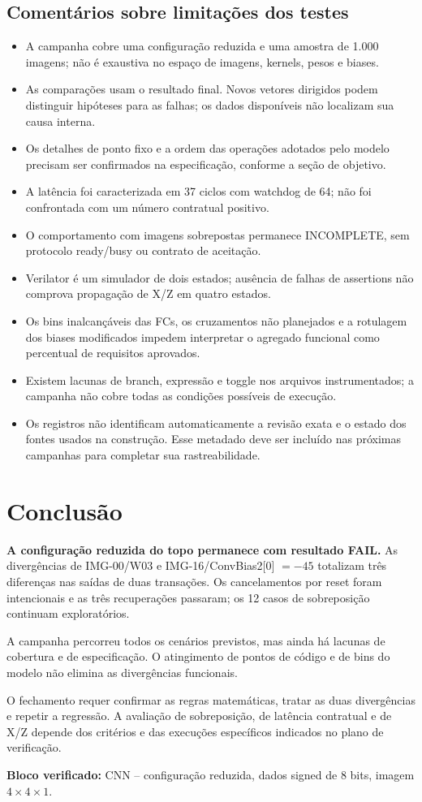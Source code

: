 \documentclass[12pt,a4paper]{article}
\begin{document}
\subsection{Comentários sobre limitações dos testes}
\begin{itemize}
\item A campanha cobre uma configuração reduzida e uma amostra de 1.000 imagens; não é exaustiva no espaço de imagens, kernels, pesos e biases.
\item As comparações usam o resultado final. Novos vetores dirigidos podem distinguir hipóteses para as falhas; os dados disponíveis não localizam sua causa interna.
\item Os detalhes de ponto fixo e a ordem das operações adotados pelo modelo precisam ser confirmados na especificação, conforme a seção de objetivo.
\item A latência foi caracterizada em 37 ciclos com watchdog de 64; não foi confrontada com um número contratual positivo.
\item O comportamento com imagens sobrepostas permanece INCOMPLETE, sem protocolo ready/busy ou contrato de aceitação.
\item Verilator é um simulador de dois estados; ausência de falhas de assertions não comprova propagação de X/Z em quatro estados.
\item Os bins inalcançáveis das FCs, os cruzamentos não planejados e a rotulagem dos biases modificados impedem interpretar o agregado funcional como percentual de requisitos aprovados.
\item Existem lacunas de branch, expressão e toggle nos arquivos instrumentados; a campanha não cobre todas as condições possíveis de execução.
\item Os registros não identificam automaticamente a revisão exata e o estado dos fontes usados na construção. Esse metadado deve ser incluído nas próximas campanhas para completar sua rastreabilidade.
\end{itemize}

\section{Conclusão}
\textbf{A configuração reduzida do topo permanece com resultado FAIL.} As divergências de IMG-00/W03 e IMG-16/ConvBias2[0] $=-45$ totalizam três diferenças nas saídas de duas transações. Os cancelamentos por reset foram intencionais e as três recuperações passaram; os 12 casos de sobreposição continuam exploratórios.

A campanha percorreu todos os cenários previstos, mas ainda há lacunas de cobertura e de especificação. O atingimento de pontos de código e de bins do modelo não elimina as divergências funcionais.

O fechamento requer confirmar as regras matemáticas, tratar as duas divergências e repetir a regressão. A avaliação de sobreposição, de latência contratual e de X/Z depende dos critérios e das execuções específicos indicados no plano de verificação.

\vfill
\begin{center}\textbf{Bloco verificado:} CNN -- configuração reduzida, dados signed de 8 bits, imagem $4\times4\times1$.\end{center}
\end{document}
